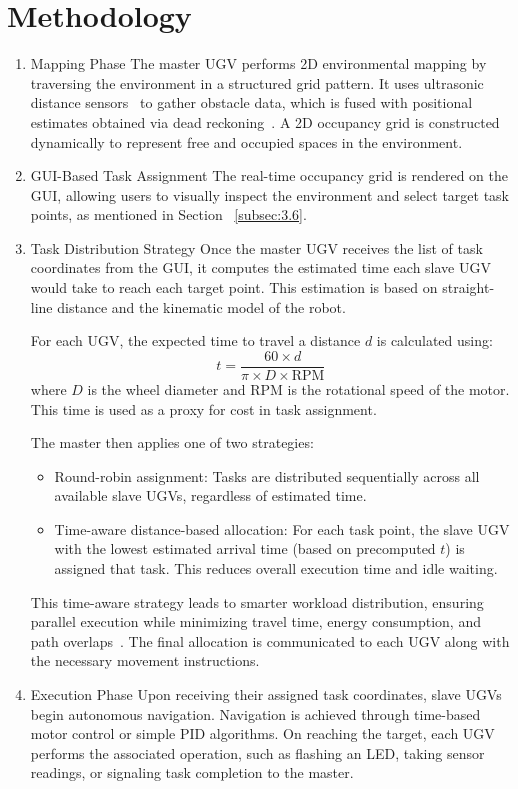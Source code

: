 \documentclass[conference]{IEEEtran}
\begin{document}
\section{Methodology}
\label{sec:Methodology}
\begin{enumerate}
	\item {Mapping Phase}
The master UGV performs 2D environmental mapping by traversing the environment in a structured grid pattern. It uses ultrasonic distance sensors~\cite{arduino_hcsr04} to gather obstacle data, which is fused with positional estimates obtained via dead reckoning~\cite{kalra2005hoplite}. A 2D occupancy grid is constructed dynamically to represent free and occupied spaces in the environment.

\item {GUI-Based Task Assignment}
The real-time occupancy grid is rendered on the GUI, allowing users to visually inspect the environment and select target task points, as mentioned in Section ~\ref{subsec:3.6}. 

\item {Task Distribution Strategy}
\label{subsec:task_dist}
Once the master UGV receives the list of task coordinates from the GUI, it computes the estimated time each slave UGV would take to reach each target point. This estimation is based on straight-line distance and the kinematic model of the robot.

For each UGV, the expected time to travel a distance $d$ is calculated using:
\begin{equation}
t = \frac{60 \times d}{\pi \times D \times \text{RPM}}
\end{equation}
where $D$ is the wheel diameter and RPM is the rotational speed of the motor. This time is used as a proxy for cost in task assignment.

The master then applies one of two strategies:
\begin{itemize}
    \item {Round-robin assignment:} Tasks are distributed sequentially across all available slave UGVs, regardless of estimated time.
    
    \item {Time-aware distance-based allocation:} For each task point, the slave UGV with the lowest estimated arrival time (based on precomputed $t$) is assigned that task. This reduces overall execution time and idle waiting.
\end{itemize}

This time-aware strategy leads to smarter workload distribution, ensuring parallel execution while minimizing travel time, energy consumption, and path overlaps~\cite{jin2024multi}. The final allocation is communicated to each UGV along with the necessary movement instructions.


\item{Execution Phase}
Upon receiving their assigned task coordinates, slave UGVs begin autonomous navigation. Navigation is achieved through time-based motor control or simple PID algorithms. On reaching the target, each UGV performs the associated operation, such as flashing an LED, taking sensor readings, or signaling task completion to the master.

\end{enumerate}
\end{document}
